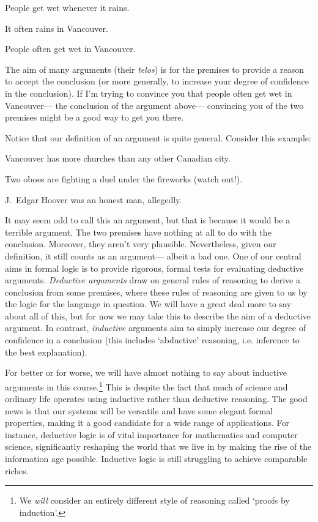 \begin{earg}
  \item[] People get wet whenever it rains.
  \item[] It often rains in Vancouver.
  \item[\therefore] People often get wet in Vancouver.
\end{earg}

The aim of many arguments (their \textit{telos}) is for the premises to provide a reason to accept the conclusion (or more generally, to increase your degree of confidence in the conclusion).
If I'm trying to convince you that people often get wet in Vancouver--- the conclusion of the argument above--- convincing you of the two premises might be a good way to get you there.

Notice that our definition of an argument is quite general. Consider this example:
\begin{earg}
  \item[] Vancouver has more churches than any other Canadian city.
  \item[] Two oboes are fighting a duel under the fireworks (watch out!).
  \item[\therefore] J.\ Edgar Hoover was an honest man, allegedly.
\end{earg}

It may seem odd to call this an argument, but that is because it would be a terrible argument.
The two premises have nothing at all to do with the conclusion.
Moreover, they aren't very plausible.
Nevertheless, given our definition, it still counts as an argument--- albeit a bad one.
One of our central aims in formal logic is to provide rigorous, formal tests for evaluating deductive arguments.
\textit{Deductive arguments} draw on general rules of reasoning to derive a conclusion from some premises, where these rules of reasoning are given to us by the logic for the language in question.
We will have a great deal more to say about all of this, but for now we may take this to describe the aim of a deductive argument.
In contrast, \textit{inductive} arguments aim to simply increase our degree of confidence in a conclusion (this includes `abductive' reasoning, i.e. inference to the best explanation). 

For better or for worse, we will have almost nothing to say about inductive arguments in this course.\footnote{We \textit{will} consider an entirely different style of reasoning called `proofs by induction'.}
This is despite the fact that much of science and ordinary life operates using inductive rather than deductive reasoning.
The good news is that our systems will be versatile and have some elegant formal properties, making it a good candidate for a wide range of applications.
For instance, deductive logic is of vital importance for mathematics and computer science, significantly reshaping the world that we live in by making the rise of the information age possible.
Inductive logic is still struggling to achieve comparable riches.

